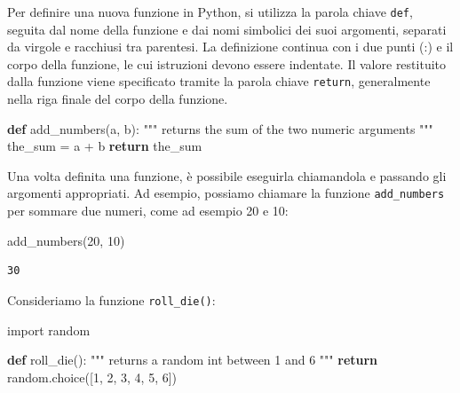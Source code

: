 \documentclass[
  letterpaper,
  krantz2]{{[}./krantz{]}}
\newenvironment{Shaded}{\begin{snugshade}}{\end{snugshade}}
\newcommand{\CommentTok}[1]{\textcolor[rgb]{0.37,0.37,0.37}{#1}}
\newcommand{\ControlFlowTok}[1]{\textcolor[rgb]{0.00,0.23,0.31}{\textbf{#1}}}
\newcommand{\DecValTok}[1]{\textcolor[rgb]{0.68,0.00,0.00}{#1}}
\newcommand{\ImportTok}[1]{\textcolor[rgb]{0.00,0.46,0.62}{#1}}
\newcommand{\KeywordTok}[1]{\textcolor[rgb]{0.00,0.23,0.31}{\textbf{#1}}}
\newcommand{\NormalTok}[1]{\textcolor[rgb]{0.00,0.23,0.31}{#1}}
\newcommand{\OperatorTok}[1]{\textcolor[rgb]{0.37,0.37,0.37}{#1}}
\begin{document}
Per definire una nuova funzione in Python, si utilizza la parola chiave
\texttt{def}, seguita dal nome della funzione e dai nomi simbolici dei
suoi argomenti, separati da virgole e racchiusi tra parentesi. La
definizione continua con i due punti (:) e il corpo della funzione, le
cui istruzioni devono essere indentate. Il valore restituito dalla
funzione viene specificato tramite la parola chiave \texttt{return},
generalmente nella riga finale del corpo della funzione.

\begin{Shaded}
\begin{Highlighting}[]
\KeywordTok{def}\NormalTok{ add\_numbers(a, b):}
    \CommentTok{"""}
\CommentTok{    returns the sum of the two numeric arguments}
\CommentTok{    """}
\NormalTok{    the\_sum }\OperatorTok{=}\NormalTok{ a }\OperatorTok{+}\NormalTok{ b}
    \ControlFlowTok{return}\NormalTok{ the\_sum}
\end{Highlighting}
\end{Shaded}

Una volta definita una funzione, è possibile eseguirla chiamandola e
passando gli argomenti appropriati. Ad esempio, possiamo chiamare la
funzione \texttt{add\_numbers} per sommare due numeri, come ad esempio
20 e 10:

\begin{Shaded}
\begin{Highlighting}[]
\NormalTok{add\_numbers(}\DecValTok{20}\NormalTok{, }\DecValTok{10}\NormalTok{)}
\end{Highlighting}
\end{Shaded}

\begin{verbatim}
30
\end{verbatim}

Consideriamo la funzione \texttt{roll\_die()}:

\begin{Shaded}
\begin{Highlighting}[]
\ImportTok{import}\NormalTok{ random}

\KeywordTok{def}\NormalTok{ roll\_die():}
    \CommentTok{"""}
\CommentTok{    returns a random int between 1 and 6}
\CommentTok{    """}
    \ControlFlowTok{return}\NormalTok{ random.choice([}\DecValTok{1}\NormalTok{, }\DecValTok{2}\NormalTok{, }\DecValTok{3}\NormalTok{, }\DecValTok{4}\NormalTok{, }\DecValTok{5}\NormalTok{, }\DecValTok{6}\NormalTok{])}
\end{Highlighting}
\end{Shaded}
\end{document}
